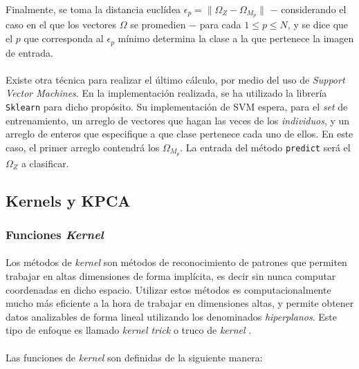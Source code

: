\documentclass[12pt, twocolumn]{article}
\begin{document}
	\paragraph{} Finalmente, se toma la distancia euclídea $\epsilon_{p} = \lVert \Omega_{Z} - \Omega_{M_{p}} \rVert$ $-$ considerando el caso en el que los vectores $\Omega$ se promedien $-$ para cada $1 \le p \le N$, y se dice que el $p$ que corresponda al $\epsilon_{p}$ mínimo determina la clase a la que pertenece la imagen de entrada. 
	
	\paragraph{} Existe otra técnica para realizar el último cálculo, por medio del uso de \textit{Support Vector Machines}. En la implementación realizada, se ha utilizado la librería \verb|Sklearn| para dicho propósito. Su implementación de SVM espera, para el \textit{set} de entrenamiento, un arreglo de vectores que hagan las veces de los \textit{individuos}, y un arreglo de enteros que especifique a que clase pertenece cada uno de ellos. En este caso, el primer arreglo contendrá los $\Omega_{M_{p}}$. La entrada del método \verb|predict| será el $\Omega_{Z}$ a clasificar. 
	
	\subsection{Kernels y KPCA}
	
	\subsubsection{Funciones \textit{Kernel}}
	
	\paragraph{} Los métodos de \textit{kernel} son métodos de reconocimiento de patrones que permiten trabajar en altas dimensiones de forma implícita, es decir sin nunca computar coordenadas en dicho espacio. Utilizar estos métodos es computacionalmente mucho más eficiente a la hora de trabajar en dimensiones altas, y permite obtener datos analizables de forma lineal utilizando los denominados \textit{hiperplanos}. Este tipo de enfoque es llamado \textit{kernel trick} o truco de \textit{kernel} \cite{kern1}. 
	
	\paragraph{} Las funciones de \textit{kernel} son definidas de la siguiente manera:
	
\end{document}
